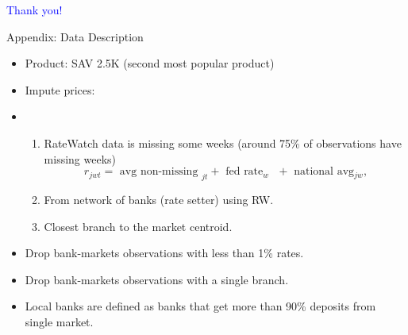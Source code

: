 \documentclass[notes,11pt, aspectratio=169]{beamer}
\begin{document}
\begin{frame}
\textcolor{blue}{\huge{\centerline{Thank you!}}}
\end{frame}

%    
%    


\appendix


 \begin{frame}[label=backg_data_appendix]{Appendix: Data Description \hyperlink{data}{}}
\begin{itemize}
  \item Product: SAV 2.5K (second most popular product)
  \item Impute prices:
  \item \begin{enumerate}
    \item RateWatch data is missing some weeks (around 75\% of observations have missing weeks)
    $$r_{jwt} = \text{ avg non-missing }_{jt} + \text{ fed rate$_w$ } + \text{ national avg$_{jw}$,} $$
    \item From network of banks (rate setter) using RW.
    \item Closest branch to the market centroid. 
  \end{enumerate}
  \item Drop bank-markets observations with less than 1\% rates.
  \item Drop bank-markets observations with a single branch.
  \item Local banks are defined as banks that get more than 90\% deposits from single market. 
\end{itemize}
\end{frame}



\end{document}
